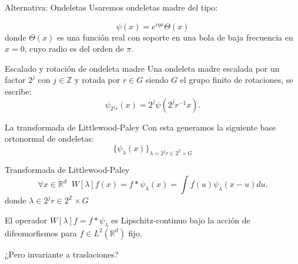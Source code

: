 \documentclass[aspectratio=43]{beamer}
\renewcommand{\cite}[1]{\footnote<.->[frame]{\fullcite{#1}}}
\begin{document}
\begin{frame}{Alternativa: Ondeletas}
  Usaremos ondeletas madre del tipo:

  \begin{equation*}
    \psi(x)=e^{i\eta x} \Theta(x)
  \end{equation*}
  donde $\Theta(x)$ es una función real con soporte en una bola de baja frecuencia en $x=0$, cuyo radio es del orden de $\pi$.

  \begin{block}{Escalado y rotación de ondeleta madre}
    Una ondeleta madre escalada por un factor $2^{j}$ con $j \in \mathbb{Z}$ y rotada por $r \in G$ siendo $G$ el grupo finito de rotaciones, se escribe:
    $$\psi_{2^j r}(x)=2^{j} \psi(2^j r^{-1} x).$$
  \end{block}
\end{frame}

\begin{frame}{La transformada de Littlewood-Paley}
  Con esta generamos la siguiente base ortonormal de ondeletas:
  \begin{equation*}
    \lbrace \psi_\lambda (x) \rbrace_{\lambda= 2^j r \in 2^\mathbb{Z} \times G}
  \end{equation*}

  \begin{block}{Transformada de Littlewood-Paley}
    \begin{equation*}
      \forall x \in  \mathbb{R}^d \;\; W[\lambda]f(x)= f \ast \psi_\lambda(x)=\int f(u)\psi_\lambda(x-u) du .
    \end{equation*}
    donde $\lambda \in 2^j r \in 2^\mathbb{Z} \times G$
  \end{block}

  El operador $W[\lambda]f=f\ast \psi_\lambda$ es Lipschitz-continuo bajo la acción de difeomorfismos para $f \in L^2(\mathbb{R}^d)$ fijo.

  \medskip

  \textcolor{tudCyan}{¿Pero invariante a traslaciones?}
\end{frame}

\end{document}
